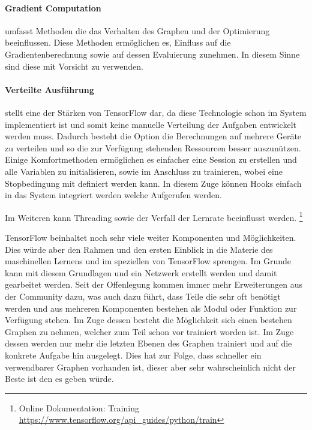 \paragraph{Gradient Computation} umfasst Methoden die das Verhalten des Graphen und der Optimierung beeinflussen. 
Diese Methoden ermöglichen es, Einfluss auf die Gradientenberechnung sowie auf dessen Evaluierung zunehmen. 
In diesem Sinne sind diese mit Vorsicht zu verwenden.

\paragraph{Verteilte Ausführung} stellt eine der Stärken von TensorFlow dar, da diese Technologie schon im System implementiert ist und somit keine manuelle Verteilung der Aufgaben entwickelt werden muss.
Dadurch besteht die Option die Berechnungen auf mehrere Geräte zu verteilen und so die zur Verfügung stehenden Ressourcen besser auszunützen. \\

\noindent
Einige Komfortmethoden ermöglichen es einfacher eine Session zu erstellen und alle Variablen zu initialisieren, sowie im Anschluss zu trainieren, wobei eine Stopbedingung mit definiert werden kann.
In diesem Zuge können Hooks einfach in das System integriert werden welche Aufgerufen werden.

\noindent
Im Weiteren kann Threading sowie der Verfall der Lernrate beeinflusst werden.
\footnote{Online Dokumentation: Training \url{https://www.tensorflow.org/api_guides/python/train}}



TensorFlow beinhaltet noch sehr viele weiter Komponenten und Möglichkeiten. 
Dies würde aber den Rahmen und den ersten Einblick in die Materie des maschinellen Lernens und im speziellen von TensorFlow sprengen. 
Im Grunde kann mit diesem Grundlagen und ein Netzwerk erstellt werden und damit gearbeitet werden. 
Seit der Offenlegung kommen immer mehr Erweiterungen aus der Community dazu, was auch dazu führt, dass Teile die sehr oft benötigt werden und aus mehreren Komponenten bestehen als Modul oder Funktion zur Verfügung stehen. 
Im Zuge dessen besteht die Möglichkeit sich einen bestehen Graphen zu nehmen, welcher zum Teil schon vor trainiert worden ist. 
Im Zuge dessen werden nur mehr die letzten Ebenen des Graphen trainiert und auf die konkrete Aufgabe hin ausgelegt. 
Dies hat zur Folge, dass schneller ein verwendbarer Graphen vorhanden ist, dieser aber sehr wahrscheinlich nicht der Beste ist den es geben würde. 

